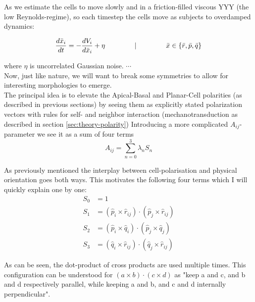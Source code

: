 As we estimate the cells to move slowly and in a friction-filled viscous YYY (the low Reynolds-regime), so each timestep the cells move as subjects to overdamped dynamics:

\begin{equation}
    \frac{d \bar{x}_i}{d t}=-\frac{d V_i}{d \bar{x}_i}+\eta \hspace{1.5cm}|\hspace{1.5cm}  \bar{x} \in \{\bar{r}, \bar{p}, \bar{q}\}
\end{equation}

where $\eta$ is uncorrelated Gaussian noise.
$\cdots$\\
Now, just like nature, we will want to break some symmetries to allow for interesting morphologies to emerge.\\
The principal idea is to elevate the Apical-Basal and Planar-Cell polarities (as described in previous sections) by seeing them as explicitly stated polarization vectors with rules for self- and neighbor interaction (mechanotransduction as described in section \ref{sec:theory-polarity})
Introducing a more complicated $A_{ij}$-parameter we see it as a sum of four terms
\begin{equation}
    A_{ij}=\sum_{n=0}^{3}\lambda_n  S_n
\end{equation}



As previously mentioned the interplay between cell-polarisation and physical orientation goes both ways. This motivates the following four terms which I will quickly explain one by one:
\begin{subequations}
\begin{align}
S_0&=1\label{eq:s0}\\
S_1&=\left(\hat{p}_i \times \hat{r}_{i j}\right) \cdot\left(\hat{p}_j \times \hat{r}_{i j}\right)\label{eq:s1}\\
S_2&=\left(\hat{p}_i \times \hat{q}_{i}\right) \cdot\left(\hat{p}_j \times \hat{q}_{j}\right)\label{eq:s2}\\
S_3&=\left(\hat{q}_i \times \hat{r}_{i j}\right) \cdot\left(\hat{q}_j \times \hat{r}_{i j}\right)\label{eq:s3}
\end{align}
\end{subequations}

As can be seen, the dot-product of cross products are used multiple times. This configuration can be understood for $\left(a \times b\right) \cdot\left(c \times d\right)$ as "keep a and c, and b and d respectively parallel, while keeping a and b, and c and d internally perpendicular".\\


